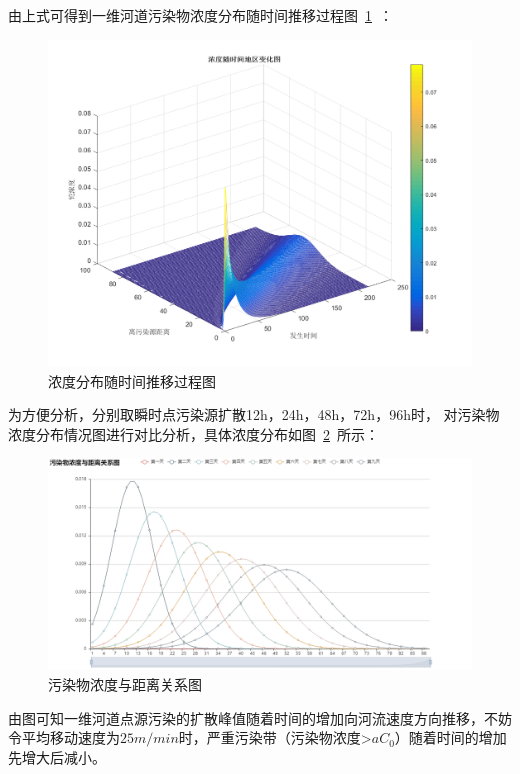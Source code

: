 \documentclass{whutmod}
\begin{document}
	由上式可得到一维河道污染物浓度分布随时间推移过程图~\ref{llllll}~：
			
	\begin{figure}[H]
		\centering
		\includegraphics[width=\textwidth]{figures/matlab.png}
		\caption{浓度分布随时间推移过程图}\label{llllll}
	\end{figure}
	
	为方便分析，分别取瞬时点污染源扩散12h，24h，48h，72h，96h时，
	对污染物浓度分布情况图进行对比分析，具体浓度分布如图~\ref{wrw}~所示：
		\begin{figure}[H]
	\centering
	\includegraphics[width=\textwidth]{figures/wrw.png}
	\caption{污染物浓度与距离关系图}\label{wrw}
	\end{figure}

	由图可知一维河道点源污染的扩散峰值随着时间的增加向河流速度方向推移，不妨令平均移动速度为$25m/min$时，严重污染带（污染物浓度>$
	aC_{0}$）随着时间的增加先增大后减小。     
	
\end{document}
